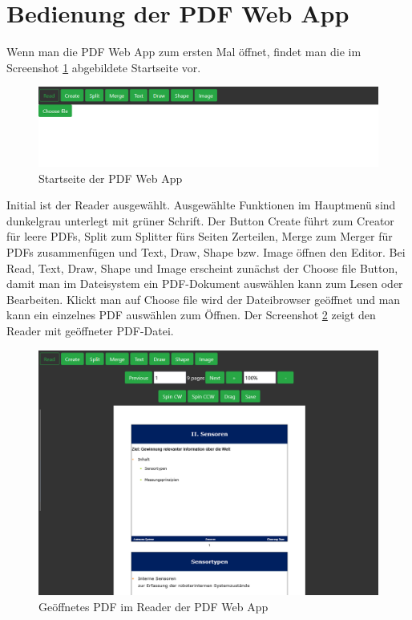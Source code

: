 \section{Bedienung der PDF Web App}
Wenn man die PDF Web App zum ersten Mal öffnet, findet man die im Screenshot \ref{fig:start} abgebildete Startseite vor.

\begin{figure}[!htb]
	\centering
	\includegraphics[width=1\textwidth]{"images/startseite.png"}
	\caption{Startseite der PDF Web App}
	\label{fig:start}
\end{figure}

Initial ist der Reader ausgewählt. Ausgewählte Funktionen im Hauptmenü sind dunkelgrau unterlegt mit grüner Schrift. Der Button Create führt zum Creator für leere PDFs, Split zum Splitter fürs Seiten Zerteilen, Merge zum Merger für PDFs zusammenfügen und Text, Draw, Shape bzw. Image öffnen den Editor. Bei Read, Text, Draw, Shape und Image erscheint zunächst der Choose file Button, damit man im Dateisystem ein PDF-Dokument auswählen kann zum Lesen oder Bearbeiten. Klickt man auf Choose file wird der Dateibrowser geöffnet und man kann ein einzelnes PDF auswählen zum Öffnen. Der Screenshot \ref{fig:reader} zeigt den Reader mit geöffneter PDF-Datei.

\begin{figure}[!htb]
	\centering
	\includegraphics[width=1\textwidth]{"images/reader.png"}
	\caption{Geöffnetes PDF im Reader der PDF Web App}
	\label{fig:reader}
\end{figure}

